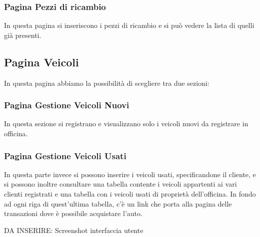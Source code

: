 \documentclass[a4paper,12pt]{report}
\begin{document}
\subsubsection*{Pagina Pezzi di ricambio}
In questa pagina si inseriscono i pezzi di ricambio e si può vedere la lista di quelli già presenti.

\subsection*{Pagina Veicoli}
In questa pagina abbiamo la possibilità di scegliere tra due sezioni:

\subsubsection*{Pagina Gestione Veicoli Nuovi}
In questa sezione si registrano e visualizzano solo i veicoli nuovi da registrare in officina.

\subsubsection*{Pagina Gestione Veicoli Usati}
In questa parte invece si possono inserire i veicoli usati, specificandone il cliente, e si possono inoltre 
%
consultare una tabella contente i veicoli appartenti ai vari clienti registrati e una tabella con i veicoli
%
usati di proprietà dell'officina. In fondo ad ogni riga di quest'ultima tabella, c'è un link che porta alla pagina
% 
delle transazioni dove è possibile acquistare l'auto.

DA INSERIRE: Screenshot interfaccia utente
\end{document}
